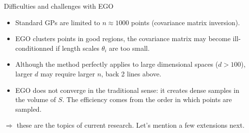 \begin{frame}{}
\begin{exampleblock}{Difficulties and challenges with EGO}
\begin{itemize}
\item Standard GPs are limited to $n \approx 1000$ points (covariance matrix inversion).
\item EGO clusters points in good regions, the covariance matrix may become ill-conditionned 
if length scales $\theta_i$ are too small.
\item Although the method perfectly applies to large dimensional spaces ($d>100$), larger $d$ 
may require larger $n$, back 2 lines above.
\item EGO does not converge in the traditional sense: it creates dense samples in the volume of $S$. 
The efficiency comes from the order in which points are sampled.
\end{itemize}
$\Rightarrow$ these are the topics of current research. Let's mention a few extensions next.
\end{exampleblock}
\end{frame}

